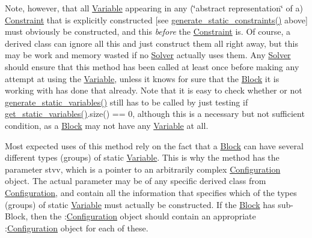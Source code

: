 Note, however, that all \mbox{\hyperlink{class_s_m_spp__di__unipi__it_1_1_variable}{Variable}} appearing in any (\char`\"{}abstract
representation\char`\"{} of a) \mbox{\hyperlink{class_s_m_spp__di__unipi__it_1_1_constraint}{Constraint}} that is explicitly constructed \mbox{[}see \mbox{\hyperlink{class_s_m_spp__di__unipi__it_1_1_m_c_f_block_a33f94035590874ef8616982e11e7bb43}{generate\+\_\+static\+\_\+constraints()}} above\mbox{]} must obviously be constructed, and this {\itshape before} the \mbox{\hyperlink{class_s_m_spp__di__unipi__it_1_1_constraint}{Constraint}} is. Of course, a derived class can ignore all this and just construct them all right away, but this may be work and memory wasted if no \mbox{\hyperlink{class_s_m_spp__di__unipi__it_1_1_solver}{Solver}} actually uses them. Any \mbox{\hyperlink{class_s_m_spp__di__unipi__it_1_1_solver}{Solver}} should ensure that this method has been called at least once before making any attempt at using the \mbox{\hyperlink{class_s_m_spp__di__unipi__it_1_1_variable}{Variable}}, unless it knows for sure that the \mbox{\hyperlink{class_s_m_spp__di__unipi__it_1_1_block}{Block}} it is working with has done that already. Note that it is easy to check whether or not \mbox{\hyperlink{class_s_m_spp__di__unipi__it_1_1_m_c_f_block_a599bd50cdc6123555aa4a6c4e22c996d}{generate\+\_\+static\+\_\+variables()}} still has to be called by just testing if \mbox{\hyperlink{class_s_m_spp__di__unipi__it_1_1_block_a6ca8b345bb506a8ac45eef39887bebea}{get\+\_\+static\+\_\+variables()}}.size() == 0, although this is a necessary but not sufficient condition, as a \mbox{\hyperlink{class_s_m_spp__di__unipi__it_1_1_block}{Block}} may not have any \mbox{\hyperlink{class_s_m_spp__di__unipi__it_1_1_variable}{Variable}} at all.

Most expected uses of this method rely on the fact that a \mbox{\hyperlink{class_s_m_spp__di__unipi__it_1_1_block}{Block}} can have several different types (groups) of static \mbox{\hyperlink{class_s_m_spp__di__unipi__it_1_1_variable}{Variable}}. This is why the method has the parameter stvv, which is a pointer to an arbitrarily complex \mbox{\hyperlink{class_s_m_spp__di__unipi__it_1_1_configuration}{Configuration}} object. The actual parameter may be of any specific derived class from \mbox{\hyperlink{class_s_m_spp__di__unipi__it_1_1_configuration}{Configuration}}, and contain all the information that specifies which of the types (groups) of static \mbox{\hyperlink{class_s_m_spp__di__unipi__it_1_1_variable}{Variable}} must actually be constructed. If the \mbox{\hyperlink{class_s_m_spp__di__unipi__it_1_1_block}{Block}} has sub-\/\+Block, then the \+:\mbox{\hyperlink{class_s_m_spp__di__unipi__it_1_1_configuration}{Configuration}} object should contain an appropriate \+:\mbox{\hyperlink{class_s_m_spp__di__unipi__it_1_1_configuration}{Configuration}} object for each of these.

